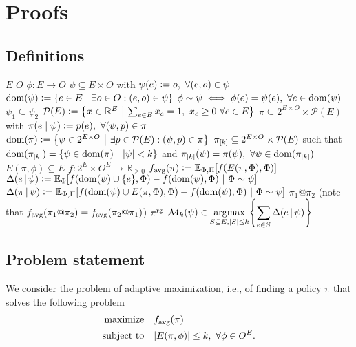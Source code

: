 \section{Proofs}

\subsection{Definitions}
\begin{description}[labelindent=0pt,leftmargin=7pt,itemindent=-2pt,itemsep=0pt]
   $E$
   $O$
   $\phi : E \to O$
   $\psi \subseteq E \times O$ with $\psi(e) \vcentcolon= o,\ \forall (e, o) \in \psi$
   $\dom(\psi) \defeq \sdef{e \in E}{\exists o \in O : (e, o) \in \psi}$
   $\phi \sim \psi \iff \phi(e) = \psi(e),\ \forall e \in \operatorname{dom}(\psi)$
   $\psi_1 \subseteq \psi_2$
   $\mathcal{P}(E) \defeq \sdef{\*x \in \mathbb{R}^E}{\sum_{e \in E} x_e = 1,\ x_e \geq 0\ \forall e \in E}$
   $\pi \subseteq 2^{E \times O} \times \mathcal{P}(E)$ with $\pi(e\mid\psi) \vcentcolon= p(e),\ \forall (\psi, p) \in \pi$
   $\dom(\pi) \defeq \sdef{\psi \in 2^{E \times O}}{\exists p \in \mathcal{P}(E) : (\psi, p) \in \pi}$
   $\pi_{[k]} \subseteq 2^{E \times O} \times \mathcal{P}(E)$ such that $\dom(\pik) = \sdef{\psi \in \dom(\pi)}{|\psi| < k}$ and $\pik(\psi) = \pi(\psi),\ \forall \psi \in \dom(\pik)$
   $E(\pi, \phi) \subseteq E$
   $f : 2^E \times O^E \to \mathbb{R}_{\geq 0}$
   $\favg(\pi) \defeq \E[\Phi,\Pi]{f(E(\pi, \Phi), \Phi)}$
   $\D{e}{\psi} \defeq \E[\Phi]{f(\dom(\psi) \cup \{e\}, \Phi) - f(\dom(\psi), \Phi)}[\Phi \sim \psi]$
   $\D{\pi}{\psi} \defeq \E[\Phi,\Pi]{f(\dom(\psi) \cup E(\pi, \Phi), \Phi) - f(\dom(\psi), \Phi)}[\Phi \sim \psi]$
   $\pi_1 @ \pi_2$ (note that $f_{\mathrm{avg}}(\pi_1 @ \pi_2) = f_{\mathrm{avg}}(\pi_2 @ \pi_1)$)
   $\pi^{\textrm{rg}}$
   $\mathcal{M}_k(\psi) \in \displaystyle\argmax_{S \subseteq E, |S| \leq k}\left\{\sum_{e \in S} \D{e}{\psi} \right\}$
\end{description}

\subsection{Problem statement}
We consider the problem of adaptive maximization, i.e., of finding a policy $\pi$ that solves the following problem
\begin{align*}
  \textrm{maximize}&\quad  f_{\mathrm{avg}}(\pi)\\
  \textrm{subject to}&\quad  |E(\pi, \phi)| \leq k,\ \forall \phi \in O^E.
\end{align*}

